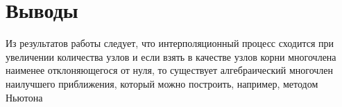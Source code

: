 \documentclass[12pt, a4paper]{article}
\begin{document}
\section{Выводы}
		Из результатов работы следует, что интерполяционный процесс сходится при увеличении количества узлов и если взять в качестве узлов корни многочлена  наименее отклоняющегося от нуля, то существует алгебраический многочлен наилучшего приближения, который можно построить, например, методом Ньютона
		
\end{document}
